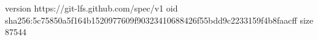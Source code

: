 version https://git-lfs.github.com/spec/v1
oid sha256:5c75850a5f164b1520977609f90323410688426f55bdd9c2233159f4b8faacff
size 87544
